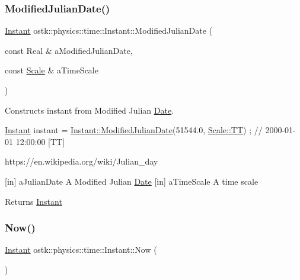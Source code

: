 \subsubsection{\texorpdfstring{Modified\+Julian\+Date()}{ModifiedJulianDate()}}
{\footnotesize\ttfamily \hyperlink{classostk_1_1physics_1_1time_1_1_instant}{Instant} ostk\+::physics\+::time\+::\+Instant\+::\+Modified\+Julian\+Date (\begin{DoxyParamCaption}\item[{const Real \&}]{a\+Modified\+Julian\+Date,  }\item[{const \hyperlink{namespaceostk_1_1physics_1_1time_adf23d37bd8641fb76a0e98ab46a70df7}{Scale} \&}]{a\+Time\+Scale }\end{DoxyParamCaption})\hspace{0.3cm}{\ttfamily [static]}}



Constructs instant from Modified Julian \hyperlink{classostk_1_1physics_1_1time_1_1_date}{Date}. 


\begin{DoxyCode}
\hyperlink{classostk_1_1physics_1_1time_1_1_instant_a132c1e4b2fe9a9a671109206e297bd5d}{Instant} instant = \hyperlink{classostk_1_1physics_1_1time_1_1_instant_af515c6d0547e40a337efb865a71c2558}{Instant::ModifiedJulianDate}(51544.0, 
      \hyperlink{namespaceostk_1_1physics_1_1time_adf23d37bd8641fb76a0e98ab46a70df7adf1f3edb9115acb0a1e04209b7a9937b}{Scale::TT}) ; \textcolor{comment}{// 2000-01-01 12:00:00 [TT]}
\end{DoxyCode}


https\+://en.wikipedia.\+org/wiki/\+Julian\+\_\+day

\mbox{[}in\mbox{]} a\+Julian\+Date A Modified Julian \hyperlink{classostk_1_1physics_1_1time_1_1_date}{Date}  \mbox{[}in\mbox{]} a\+Time\+Scale A time scale \begin{DoxyReturn}{Returns}
\hyperlink{classostk_1_1physics_1_1time_1_1_instant}{Instant} 
\end{DoxyReturn}
\mbox{\label{classostk_1_1physics_1_1time_1_1_instant_afbc9a9219aa94e8a828f5876ee68f42c}} 
\subsubsection{\texorpdfstring{Now()}{Now()}}
{\footnotesize\ttfamily \hyperlink{classostk_1_1physics_1_1time_1_1_instant}{Instant} ostk\+::physics\+::time\+::\+Instant\+::\+Now (\begin{DoxyParamCaption}{ }\end{DoxyParamCaption})\hspace{0.3cm}{\ttfamily [static]}}



